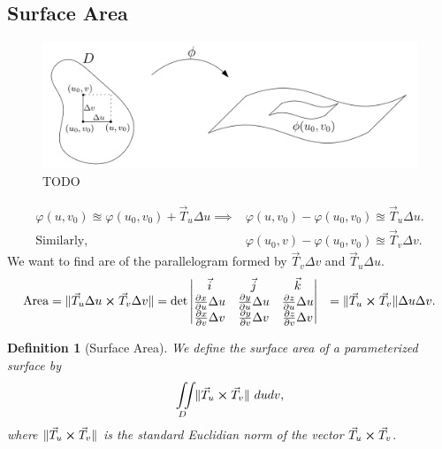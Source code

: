 \documentclass[
	12pt,
	]{article}
\DeclarePairedDelimiter{\norm}{\lVert}{\rVert}
\theoremstyle{custom}
\theoremstyle{custom}
\theoremstyle{custom}
\theoremstyle{custom}
\newtheorem{definition}{Definition}[section]
\theoremstyle{custom}
\theoremstyle{definition}
\theoremstyle{example}
\theoremstyle{note}
\theoremstyle{remark}
\theoremstyle{example}
\newcounter{theo}[section]\setcounter{theo}{0}
\numberwithin{equation}{subsection}
\begin{document}
				\subsection{Surface Area}
				\begin{figure}[H]
					\centering
					\includegraphics[width=0.8\linewidth]{MATH314_Notes_Fig8.png}
					\captionsetup{margin=1cm , justification = raggedright} \caption{TODO}
				\end{figure}
				\begin{align*}
					\varphi(u,v_{0}) \approxeq \varphi(u_{0},v_{0}) + \vec{T}_{u}\Delta u \implies & \varphi(u,v_{0}) - \varphi(u_{0},v_{0}) \approxeq \vec{T}_{u}\Delta u. \\
					\text{Similarly, }&\varphi(u_{0},v) -\varphi(u_{0},v_{0}) \approxeq \vec{T}_{v}\Delta v.
				\end{align*}
				We want to find are of the parallelogram formed by $\vec{T}_{v}\Delta v$ and $\vec{T}_{u}\Delta u$.
				\begin{align*}
					\text{Area} &= \norm{\vec{T}_{u}\Delta u \cross \vec{T}_{v}\Delta v} = \det 
					\begin{vmatrix}
						\vec{i} & \vec{j} & \vec{k} \\ 
						\pdv{x}{u}\Delta u & \pdv{y}{u}\Delta u & \pdv{z}{u} \Delta u \\
						\pdv{x}{v}\Delta v & \pdv{y}{v}\Delta v & \pdv{z}{v} \Delta v
					\end{vmatrix}
					&= \norm{\vec{T}_{u} \cross \vec{T}_{v}} \Delta u \Delta v.
				\end{align*}
				
				\begin{definition}[Surface Area]
					We define the surface area of a parameterized surface by 
					\begin{equation} 
					\iint\limits_{D} \norm{\vec{T}_{u} \cross \vec{T}_{v}}\ dudv,
					\end{equation}
					where $\norm{\vec{T}_{u} \cross \vec{T}_{v}}$ is the standard Euclidian norm of the vector $\vec{T}_{u} \cross \vec{T}_{v}$.
				\end{definition}
				
\end{document}

